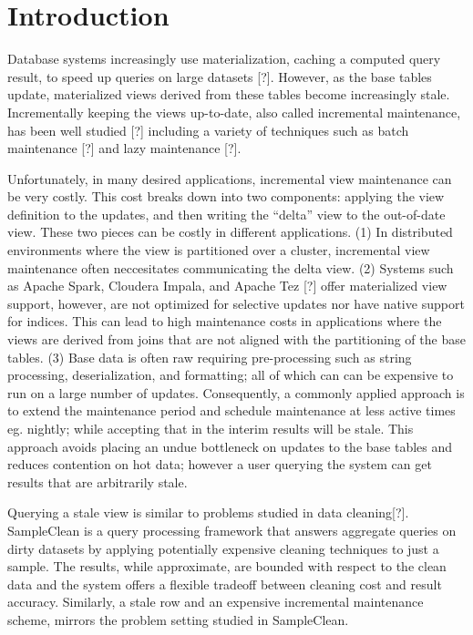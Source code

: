 \section{Introduction}
Database systems increasingly use materialization, caching a computed
query result, to speed up queries on large datasets {[}?{]}. However,
as the base tables update, materialized views derived from these tables
become increasingly stale. Incrementally keeping the views up-to-date,
also called incremental maintenance, has been well studied {[}?{]}
including a variety of techniques such as batch maintenance {[}?{]}
and lazy maintenance {[}?{]}. 

Unfortunately, in many desired applications, incremental view maintenance
can be very costly. This cost breaks down into two components: applying
the view definition to the updates, and then writing the ``delta''
view to the out-of-date view. These two pieces can be costly in different
applications. (1) In distributed environments where the view is partitioned
over a cluster, incremental view maintenance often neccesitates communicating
the delta view. (2) Systems such as Apache Spark, Cloudera Impala,
and Apache Tez {[}?{]} offer materialized view support, however, are
not optimized for selective updates nor have native support for indices.
This can lead to high maintenance costs in applications where the
views are derived from joins that are not aligned with the partitioning
of the base tables. (3) Base data is often raw requiring pre-processing
such as string processing, deserialization, and formatting; all of
which can can be expensive to run on a large number of updates. Consequently,
a commonly applied approach is to extend the maintenance period and
schedule maintenance at less active times eg. nightly; while accepting
that in the interim results will be stale. This approach avoids placing
an undue bottleneck on updates to the base tables and reduces contention
on hot data; however a user querying the system can get results that
are arbitrarily stale.

Querying a stale view is similar to problems studied in data cleaning{[}?{]}.
SampleClean is a query processing framework that answers aggregate
queries on dirty datasets by applying potentially expensive cleaning
techniques to just a sample. The results, while approximate, are bounded
with respect to the clean data and the system offers a flexible tradeoff
between cleaning cost and result accuracy. Similarly, a stale row
and an expensive incremental maintenance scheme, mirrors the problem
setting studied in SampleClean. 

